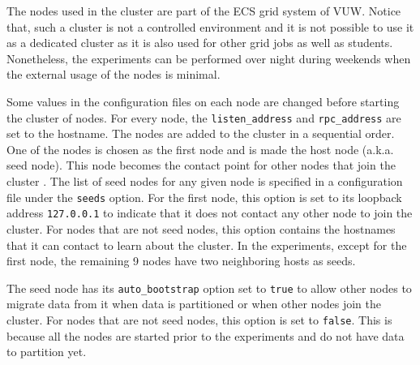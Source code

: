  


% 			

The nodes used in the cluster are part of the \ac{ECS} grid system of
\ac{VUW}. Notice that, such a cluster is not a controlled environment and it is
not possible to use it as  a dedicated cluster as it is also used for other grid
jobs as well as students. Nonetheless, the experiments can be performed over
night during weekends when the external usage of the nodes is minimal.

Some values in the configuration files on each node are changed before starting
the cluster of nodes.  For every node,  the \texttt{listen\_address} and
\texttt{rpc\_address} are set to the hostname.  The nodes are added to the
cluster in a sequential order.  One of the nodes is chosen as the first node and
is made the host node (a.k.a. seed node).  
This node becomes the contact point
for other nodes that join the cluster .
The list of seed nodes for any given node is specified in a configuration file under the \texttt{seeds} option.  For the
 first node,  this option is set to its loopback address \texttt{127.0.0.1}
 to indicate that it does not contact any other node to join the cluster.  For
 nodes that are not seed nodes, this option contains the hostnames that it can
contact to learn about the cluster.  In the experiments,  except for the first
node, the remaining 9 nodes have two neighboring hosts  as seeds. 

The seed node has its \texttt{auto\_bootstrap} option set to \texttt{true} to
allow other nodes to migrate data from it when data is partitioned or when other
nodes join the cluster.  For nodes that are not seed nodes,  this option is set
to \texttt{false}.  This is because all the nodes are started prior to the 
experiments and do not have data to partition yet. 
 
